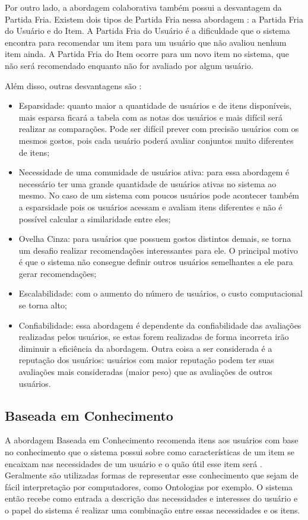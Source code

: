 Por outro lado, a abordagem colaborativa também possui a desvantagem da Partida Fria. Existem dois tipos de Partida Fria
nessa abordagem \cite{adomavicius2005toward}: a Partida Fria do Usuário e do Item. A Partida Fria do Usuário é a dificuldade
que o sistema encontra para recomendar um item para um usuário que não avaliou nenhum item ainda. A Partida Fria do Item
ocorre para um novo item no sistema, que não será recomendado enquanto não for avaliado por algum usuário.

Além disso, outras desvantagens são \cite{adomavicius2005toward}:

\begin{itemize}
\item Esparsidade: quanto maior a quantidade de usuários e de itens disponíveis, mais esparsa ficará a tabela com as
notas dos usuários e mais difícil será realizar as comparações. Pode ser difícil prever com precisão usuários com os
mesmos gostos, pois cada usuário poderá avaliar conjuntos muito diferentes de itens;
\item Necessidade de uma comunidade de usuários ativa: para essa abordagem é necessário ter uma grande quantidade de
usuários ativas no sistema ao mesmo. No caso de um sistema com poucos usuários pode acontecer também a esparsidade
pois os usuários acessam e avaliam itens diferentes e não é possível calcular a similaridade entre eles;
\item Ovelha Cinza: para usuários que possuem gostos distintos demais, se torna um desafio realizar recomendações
interessantes para ele. O principal motivo é que o sistema não consegue definir outros usuários semelhantes a ele para
gerar recomendações;
\item Escalabilidade: com o aumento do número de usuários, o custo computacional se torna alto;
\item Confiabilidade: essa abordagem é dependente da confiabilidade das avaliações realizadas pelos usuários, se estas forem
realizadas de forma incorreta irão diminuir a eficiência da abordagem. Outra coisa a ser considerada é a reputação dos
usuários: usuários com maior reputação podem ter suas avaliações mais consideradas (maior peso) que as avaliações de
outros usuários.
\end{itemize}

\subsection{Baseada em Conhecimento}

A abordagem Baseada em Conhecimento recomenda itens aos usuários com base no conhecimento que o sistema possui sobre
como características de um item se encaixam nas necessidades de um usuário e o quão útil esse item será
\cite{ricci2011introduction}. Geralmente são utilizadas formas de representar esse conhecimento que sejam de fácil interpretação
por computadores, como Ontologias por exemplo\cite{burke2002hybrid}. O sistema então recebe como entrada a descrição das necessidades e interesses do usuário e o
papel do sistema é realizar uma combinação entre essas necessidades e os itens.

